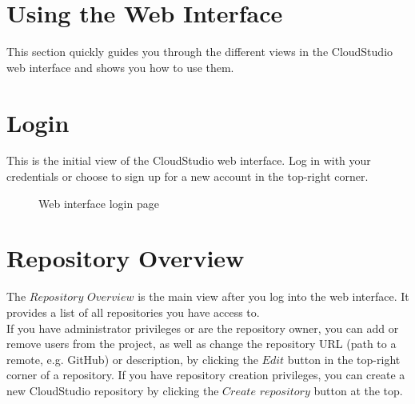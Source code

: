 \section{Using the Web Interface}\label{webinterfaceguide}



This section quickly guides you through the different views in the CloudStudio web interface and shows you how to use them.


\section{Login}

This is the initial view of the CloudStudio web interface. Log in with your credentials or choose to sign up for a new account in the top-right corner.





\begin{figure}[h!]
  \centering
  \caption{Web interface login page}
  \label{fig:login}
\end{figure}



\section{Repository Overview}

The $Repository$ $Overview$ is the main view after you log into the web interface. It provides a list of all repositories you have access to. \\

If you have administrator privileges or are the repository owner, you can add or remove users from the project, as well as change the repository URL (path to a remote, e.g. GitHub) or description, by clicking the $Edit$ button in the top-right corner of a repository. If you have repository creation privileges, you can create a new CloudStudio repository by clicking the $Create$ $repository$ button at the top. \\

